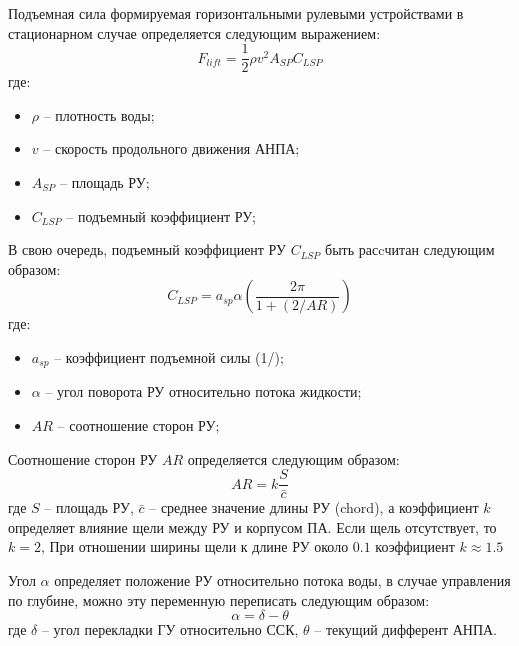 Подъемная сила формируемая горизонтальными рулевыми устройствами в стационарном случае определяется следующим выражением:
\begin{equation}
    F_{lift} = \frac{1}{2}\rho v^2 A_{SP} C_{LSP}
\end{equation}
\noindent где:
\begin{itemize}
    \item $\rho$ -- плотность воды;
    \item $v$ -- скорость продольного движения АНПА;
    \item $A_{SP}$ -- площадь РУ;
    \item $C_{LSP}$ -- подъемный коэффициент РУ;
\end{itemize}

В свою очередь, подъемный коэффициент РУ $C_{LSP}$ быть расcчитан следующим образом:
\begin{equation}
    C_{LSP} = a_{sp}\alpha \left( \frac{2 \pi}{1 + (2/AR)} \right)
\end{equation}
\noindent где:
\begin{itemize}
    \item $a_{sp}$ -- коэффициент подъемной силы (1/\degree);
    \item $\alpha$ -- угол поворота РУ относительно потока жидкости;
    \item $AR$ -- соотношение сторон РУ;
\end{itemize}

Соотношение сторон РУ $AR$ определяется следующим образом:
\begin{equation}
    AR = k \frac{S}{\bar{c}}
\end{equation}
\noindent где $S$ -- площадь РУ, $\bar{c}$ -- среднее значение длины РУ (chord), а коэффициент $k$ определяет влияние щели между РУ и корпусом ПА. Если щель отсутствует, то $k=2$, При отношении ширины щели к длине РУ около $0.1$ коэффициент $k\approx1.5$

Угол $\alpha$ определяет положение РУ относительно потока воды, в случае управления по глубине, можно эту переменную переписать следующим образом:
\begin{equation}
    \alpha = \delta - \theta
\end{equation}
\noindent где $\delta$ -- угол перекладки ГУ относительно ССК, $\theta$ -- текущий дифферент АНПА.

